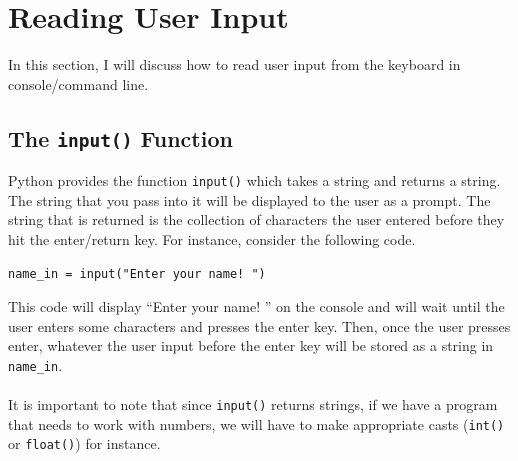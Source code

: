 \documentclass{article}
\begin{document}
\newpage

\section{Reading User Input}
In this section, I will discuss how to read user input from the keyboard in console/command line.

\subsection{The \texttt{input()} Function}
Python provides the function \texttt{input()} which takes a string and returns a string. The string that you pass into it will be displayed to the user as a prompt. The string that is returned is the collection of characters the user entered before they hit the enter/return key. For instance, consider the following code.
\begin{verbatim}
name_in = input("Enter your name! ")
\end{verbatim}
This code will display ``Enter your name! '' on the console and will wait until the user enters some characters and presses the enter key. Then, once the user presses enter, whatever the user input before the enter key will be stored as a string in \texttt{name\_in}.\\\\
It is important to note that since \texttt{input()} returns strings, if we have a program that needs to work with numbers, we will have to make appropriate casts (\texttt{int()} or \texttt{float()}) for instance. 
\end{document}

